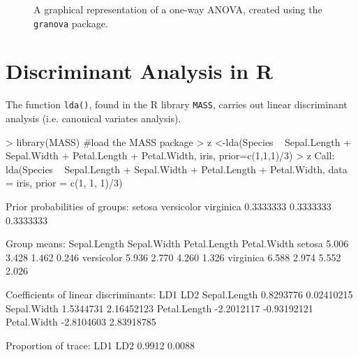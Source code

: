 \begin{figure}[ht!]
  \caption{A graphical representation of a one-way ANOVA, created using the \texttt{granova} package.\label{fig:granova}}
\end{figure}


\section{Discriminant Analysis in R}

The function \texttt{lda()}, found in the R library \texttt{MASS}, carries out linear discriminant analysis (i.e. canonical variates analysis).


\begin{R}
> library(MASS) #load the MASS package
> z <-lda(Species ~ Sepal.Length + Sepal.Width + Petal.Length + Petal.Width, iris, prior=c(1,1,1)/3)
> z
Call:
lda(Species ~ Sepal.Length + Sepal.Width + Petal.Length + Petal.Width,
    data = iris, prior = c(1, 1, 1)/3)

Prior probabilities of groups:
    setosa versicolor  virginica
 0.3333333  0.3333333  0.3333333

Group means:
           Sepal.Length Sepal.Width Petal.Length Petal.Width
setosa            5.006       3.428        1.462       0.246
versicolor        5.936       2.770        4.260       1.326
virginica         6.588       2.974        5.552       2.026

Coefficients of linear discriminants:
                    LD1         LD2
Sepal.Length  0.8293776  0.02410215
Sepal.Width   1.5344731  2.16452123
Petal.Length -2.2012117 -0.93192121
Petal.Width  -2.8104603  2.83918785

Proportion of trace:
   LD1    LD2
0.9912 0.0088
\end{R}

